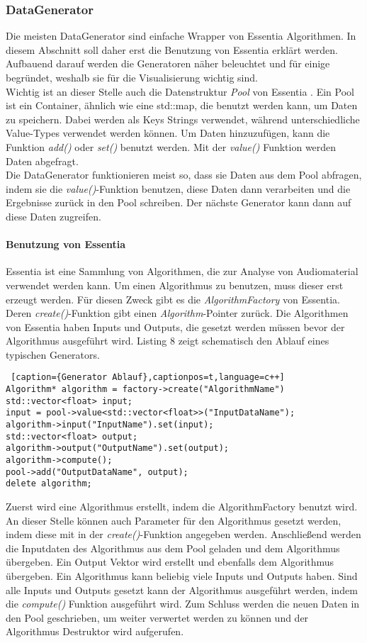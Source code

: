 \documentclass[11pt,a4paper]{article}
\begin{document}
\subsubsection{DataGenerator}
Die meisten DataGenerator sind einfache Wrapper von Essentia Algorithmen. In diesem Abschnitt soll daher erst die Benutzung von Essentia erklärt werden. Aufbauend darauf werden die Generatoren näher beleuchtet und für einige begründet, weshalb sie für die Visualisierung wichtig sind.\\
Wichtig ist an dieser Stelle auch die Datenstruktur \textit{Pool} von Essentia \cite{EssentiaPool}. Ein Pool ist ein Container, ähnlich wie eine std::map, die benutzt werden kann, um Daten zu speichern. Dabei werden als Keys Strings verwendet, während unterschiedliche Value-Types verwendet werden können. Um Daten hinzuzufügen, kann die Funktion \textit{add()} oder \textit{set()} benutzt werden. Mit der \textit{value()} Funktion werden Daten abgefragt.\\
Die DataGenerator funktionieren meist so, dass sie Daten aus dem Pool abfragen, indem sie die \textit{value()}-Funktion benutzen, diese Daten dann verarbeiten und die Ergebnisse zurück in den Pool schreiben. Der nächste Generator kann dann auf diese Daten zugreifen.
\paragraph{Benutzung von Essentia}
Essentia ist eine Sammlung von Algorithmen, die zur Analyse von Audiomaterial verwendet werden kann. Um einen Algorithmus zu benutzen, muss dieser erst erzeugt werden. Für diesen Zweck gibt es die \textit{AlgorithmFactory} von Essentia. Deren \textit{create()}-Funktion gibt einen \textit{Algorithm}-Pointer zurück. Die Algorithmen von Essentia haben Inputs und Outputs, die gesetzt werden müssen bevor der Algorithmus ausgeführt wird. Listing 8 zeigt schematisch den Ablauf eines typischen Generators.
\begin{lstlisting} [caption={Generator Ablauf},captionpos=t,language=c++]
Algorithm* algorithm = factory->create("AlgorithmName")
std::vector<float> input;
input = pool->value<std::vector<float>>("InputDataName");
algorithm->input("InputName").set(input);
std::vector<float> output;
algorithm->output("OutputName").set(output);
algorithm->compute();
pool->add("OutputDataName", output);
delete algorithm;
\end{lstlisting}
\noindent
Zuerst wird eine Algorithmus erstellt, indem die AlgorithmFactory benutzt wird. An dieser Stelle können auch Parameter für den Algorithmus gesetzt werden, indem diese mit in der \textit{create()}-Funktion angegeben werden. Anschließend werden die Inputdaten des Algorithmus aus dem Pool geladen und dem Algorithmus übergeben. Ein Output Vektor wird erstellt und ebenfalls dem Algorithmus übergeben. Ein Algorithmus kann beliebig viele Inputs und Outputs haben. Sind alle Inputs und Outputs gesetzt kann der Algorithmus ausgeführt werden, indem die \textit{compute()} Funktion ausgeführt wird. Zum Schluss werden die neuen Daten in den Pool geschrieben, um weiter verwertet werden zu können und der Algorithmus Destruktor wird aufgerufen.
\end{document}

